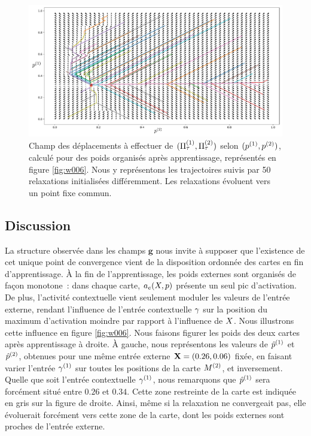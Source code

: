 \documentclass[../main]{subfiles}
\begin{document}
\begin{figure}
\centering
\includegraphics[width=\textwidth]{champ_006.pdf}
\caption{Champ des déplacements à effectuer de $(\Pi^{({1})}_\tau, \Pi^{({2})}_\tau)$ selon $(p^{({1})}, p^{({2})})$, calculé pour des poids organisés après apprentissage, représentés en figure \ref{fig:w006}. Nous y représentons les trajectoires suivis par 50 relaxations initialisées différemment. Les relaxations évoluent vers un point fixe commun.}
\label{fig:champ_9999}
\end{figure}

\subsection{Discussion}
La structure observée dans les champs $\mathbf{g}$ nous invite à supposer que l'existence de cet unique point de convergence vient de la disposition ordonnée des cartes en fin d'apprentissage. 
\`A la fin de l'apprentissage, les poids externes sont organisés de façon monotone~: dans chaque carte, $a_e(X,p)$ présente un seul pic d'activation.
De plus, l'activité contextuelle vient seulement moduler les valeurs de l'entrée externe, rendant l'influence de l'entrée contextuelle $\gamma$ sur la position du maximum d'activation moindre par rapport à l'influence de $X$.
Nous illustrons cette influence en figure \ref{fig:w006}. 
Nous faisons figurer les poids des deux cartes après apprentissage à droite. 
\`A gauche, nous représentons les valeurs de $\hat{p}^{({1})}$ et $\hat{p}^{({2})}$, obtenues pour une même entrée externe $\mathbf{X} = (0.26, 0.06)$ fixée, en faisant varier l'entrée $\gamma^{({1})}$ sur toutes les positions de la carte $M^{({2})}$, et inversement.
Quelle que soit l'entrée contextuelle $\gamma^{({1})}$, nous remarquons que $\hat{p}^{({1})}$ sera forcément situé entre $0.26$ et $0.34$.
Cette zone restreinte de la carte est indiquée en gris sur la figure de droite.
Ainsi, même si la relaxation ne convergeait pas, elle évoluerait forcément vers cette zone de la carte, dont les poids externes sont proches de l'entrée externe.
\end{document}
